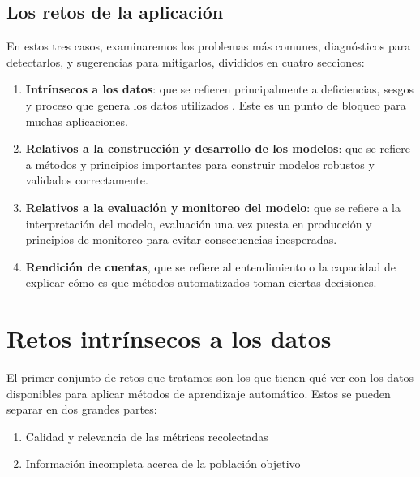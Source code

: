 \documentclass[
]{book}
\providecommand{\tightlist}{%
  \setlength{\itemsep}{0pt}\setlength{\parskip}{0pt}}
\begin{document}
\pagebreak

\hypertarget{los-retos-de-la-aplicaciuxf3n}{%
\section{Los retos de la aplicación}\label{los-retos-de-la-aplicaciuxf3n}}

En estos tres casos, examinaremos los problemas más comunes, diagnósticos para detectarlos, y sugerencias
para mitigarlos, divididos en cuatro secciones:

\begin{enumerate}
\def\labelenumi{\arabic{enumi}.}
\tightlist
\item
  \textbf{Intrínsecos a los datos}: que se refieren principalmente a deficiencias, sesgos y proceso que genera los datos utilizados \citep{biasdata}. Este es un punto de bloqueo para muchas aplicaciones.
\item
  \textbf{Relativos a la construcción y desarrollo de los modelos}: que se refiere a métodos y principios importantes para construir modelos robustos y validados correctamente.
\item
  \textbf{Relativos a la evaluación y monitoreo del modelo}: que se refiere a la interpretación del modelo, evaluación una vez puesta en producción y principios de monitoreo para evitar consecuencias inesperadas.
\item
  \textbf{Rendición de cuentas}, que se refiere al entendimiento o la capacidad de explicar
  cómo es que métodos automatizados toman ciertas decisiones.
\end{enumerate}

\hypertarget{retos-intruxednsecos-a-los-datos}{%
\chapter{Retos intrínsecos a los datos}\label{retos-intruxednsecos-a-los-datos}}

El primer conjunto de retos que tratamos son los que tienen qué ver
con los datos disponibles para aplicar métodos de aprendizaje automático.
Estos se pueden separar en dos grandes partes:

\begin{enumerate}
\def\labelenumi{\arabic{enumi}.}
\tightlist
\item
  Calidad y relevancia de las métricas recolectadas
\item
  Información incompleta acerca de la población objetivo
\end{enumerate}
\end{document}
